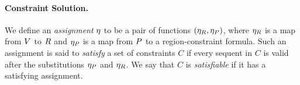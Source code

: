 %
%
%
%
%
%
%

\paragraph{Constraint Solution.}
We define an \emph{assignment} $\eta$ to be a pair of functions $(\eta_R,\eta_P)$,
where $\eta_R$ is a map from $V$ to $R$
and $\eta_P$ is a map from $P$ to a region-constraint formula.
Such an assignment is said to \emph{satisfy} a set of constraints $C$ if
every sequent in $C$ is valid after the substitutions $\eta_P$ and $ \eta_R$.
We say that $C$ is \emph{satisfiable} if it has a satisfying assignment.

